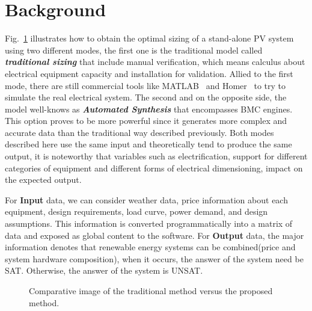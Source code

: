 \documentclass[10pt,journal,compsoc]{IEEEtran}
\begin{document}
\section{Background}
\label{sec:AutomatedVerification}
\vspace{-1ex}\color{blue}
Fig.~\ref{fig:optimization} illustrates how to obtain the optimal sizing of a stand-alone PV system using two different modes, the first one is the traditional model called \textit{\textbf{traditional sizing}} that include manual verification, which means calculus about electrical equipment capacity and installation for validation. Allied to the first mode, there are still commercial tools like MATLAB~\cite{Benatiallah2017} and Homer~\cite{Pradhan,Swarnkar} to try to simulate the real electrical system. The second and on the opposite side, the model well-knows as \textbf{\textit{Automated Synthesis}} that encompasses BMC engines. This option proves to be more powerful since it generates more complex and accurate data than the traditional way described previously.
Both modes described here use the same input and theoretically tend to produce the same output, it is noteworthy that variables such as electrification, support for different categories of equipment and different forms of electrical dimensioning, impact on the expected output.

For \textbf{Input} data, we can consider weather data, price information about each equipment, design requirements, load curve, power demand, and design assumptions. This information is converted programmatically into a matrix of data and exposed as global content to the software. For \textbf{Output} data, the major information denotes that renewable energy systems can be combined(price and system hardware composition), when it occurs, the answer of the system need be SAT. Otherwise, the answer of the system is UNSAT.
%
\begin{figure}[h]
\centering
\caption{Comparative image of the traditional method versus the proposed method.}
\label{fig:optimization}
\end{figure}
\end{document}
